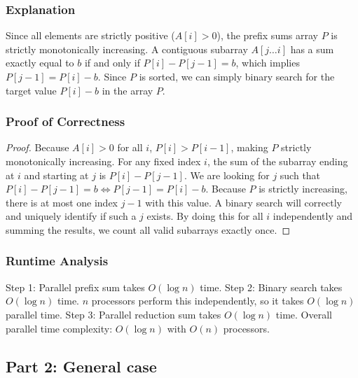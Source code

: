 \documentclass{article}
\begin{document}
\subsubsection{Explanation}
Since all elements are strictly positive ($A[i] > 0$), the prefix sums array $P$ is strictly monotonically increasing. A contiguous subarray $A[j \dots i]$ has a sum exactly equal to $b$ if and only if $P[i] - P[j-1] = b$, which implies $P[j-1] = P[i] - b$. Since $P$ is sorted, we can simply binary search for the target value $P[i] - b$ in the array $P$.

\subsubsection{Proof of Correctness}
\begin{proof}
Because $A[i] > 0$ for all $i$, $P[i] > P[i-1]$, making $P$ strictly monotonically increasing. For any fixed index $i$, the sum of the subarray ending at $i$ and starting at $j$ is $P[i] - P[j-1]$. We are looking for $j$ such that $P[i] - P[j-1] = b \iff P[j-1] = P[i] - b$. Because $P$ is strictly increasing, there is at most one index $j-1$ with this value. A binary search will correctly and uniquely identify if such a $j$ exists. By doing this for all $i$ independently and summing the results, we count all valid subarrays exactly once.
\end{proof}

\subsubsection{Runtime Analysis}
Step 1: Parallel prefix sum takes $O(\log n)$ time.
Step 2: Binary search takes $O(\log n)$ time. $n$ processors perform this independently, so it takes $O(\log n)$ parallel time.
Step 3: Parallel reduction sum takes $O(\log n)$ time.
Overall parallel time complexity: $O(\log n)$ with $O(n)$ processors.

\subsection{Part 2: General case}
\end{document}
